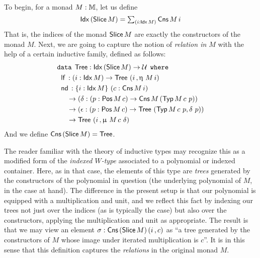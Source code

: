To begin, for a monad $M : \mathbb{M}$, let us define
\[ \mathsf{Idx}\, (\mathsf{Slice}\, M) = \textstyle{\sum_{(i : \mathsf{Idx}\,M)}}\, \mathsf{Cns}\, M\, i \] That is, the
indices of the monad $\mathsf{Slice}\, M$ are exactly the constructors of the
monad $M$.  Next, we are going to capture the notion of \emph{relation
  in $M$} with the help of a certain inductive family, defined as
follows:
\begin{align*}
  &\texttt{data}\hspace{1ex} \mathsf{Tree} : \Idx (\Slice M) \to \UU \hspace{1ex} \texttt{where} \\
  &\hspace{.2cm}\lf : (i : \Idx M) \to \mathsf{Tree}\ (i\, , \upeta\ M\, i) \\
  &\hspace{.2cm}\nd : \{i : \Idx M\}\ (c : \Cns M\, i)\\
  &\hspace{.5cm}\to (\delta : (p : \Pos M\, c) \to \Cns M\, (\Typ M\, c\ p))\\ 
  &\hspace{.5cm}\to (\epsilon : (p : \Pos M\, c) \to \mathsf{Tree}\ (\Typ M\, c\ p, \delta\ p))\\ 
  &\hspace{.5cm}\to \mathsf{Tree}\ (i\, , \upmu\ M\, c\ \delta)
\end{align*}
And we define $\mathsf{Cns}\, (\mathsf{Slice}\, M) = \mathsf{Tree}$.

The reader familiar with the theory of inductive types may recognize
this as a modified form of the \emph{indexed $W$-type} associated to a
polynomial or indexed container.  Here, as in that case, the elements
of this type are \emph{trees} generated by the constructors of the
polynomial in question (the underlying polynomial of $M$, in the case
at hand).  The difference in the present setup is that our polynomial
is equipped with a multiplication and unit, and we reflect this fact
by indexing our trees not just over the indices (as is typically the
case) but also over the constructors, applying the multiplication and
unit as appropriate.  The result is that we may view an element
$\sigma : \mathsf{Cns}\, (\mathsf{Slice}\, M)\, (i \,, c)$ as ``a tree generated by the
constructors of $M$ whose image under iterated multiplication is
$c$''.  It is in this sense that this definition captures the
\emph{relations} in the original monad $M$.

